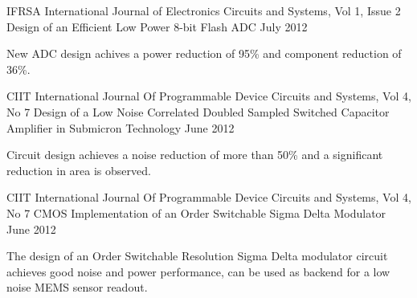 

\begin{cventries}

  \cventry
    {IFRSA International Journal of Electronics Circuits and Systems, Vol 1, Issue 2} %
    {Design of an Efficient Low Power 8-bit Flash ADC} %
    {} %
    {July 2012} %
    {
      \begin{cvitems} %
        \item {New ADC design achives a power reduction of 95\% and component reduction of 36\%.}
      \end{cvitems}
    }

  \cventry
    {CIIT International Journal Of Programmable Device Circuits and Systems, Vol 4, No 7} %
    {Design of a Low Noise Correlated Doubled Sampled Switched Capacitor Amplifier in Submicron Technology} %
    {} %
    {June 2012} %
    {
      \begin{cvitems} %
        \item {Circuit design achieves a noise reduction of more than 50\% and a significant reduction in area is observed.}
      \end{cvitems}
    }

  \cventry
    {CIIT International Journal Of Programmable Device Circuits and Systems, Vol 4, No 7} %
    {CMOS Implementation of an Order Switchable Sigma Delta Modulator} %
    {} %
    {June 2012} %
    {
      \begin{cvitems} %
        \item {The design of an Order Switchable Resolution Sigma Delta modulator circuit achieves good noise and power performance, can be used as backend for a low noise MEMS sensor readout.}
      \end{cvitems}
    }

\end{cventries}
